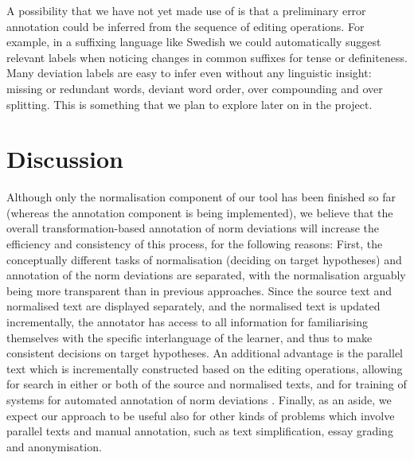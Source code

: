 \documentclass[10pt, a4paper]{article}
\newcommand{\dan}[1]{{\color{Fuchsia}{Dan: #1}}}
\newcommand{\elena}[1]{{\color{BrickRed}{Elena: #1}}}
\newcommand{\normAnn}[0]{our tool }
\begin{document}
A possibility that we have not yet made use of is that a preliminary error annotation could be inferred from the sequence of editing operations. For example, in a suffixing language like Swedish we could automatically
suggest relevant labels when noticing changes in common suffixes for tense
or definiteness.
Many deviation labels are easy to infer even without any linguistic
insight: missing or redundant words, deviant word order, over compounding
and over splitting.
This is something that we plan to explore later on in the project.


\section{Discussion}
\label{sec:discussion}


Although only the normalisation component of \normAnn has been finished so far (whereas the annotation component is being implemented), we believe that the overall transformation-based annotation of norm deviations
will increase the efficiency and consistency of this process, for the following reasons: %
First, the conceptually different tasks of normalisation (deciding on target hypotheses) and annotation of the norm deviations are separated, with the normalisation arguably being more transparent than in previous approaches. Since the source text and normalised text are displayed separately, and the normalised text is updated incrementally, the annotator has access to all information for familiarising themselves with the specific interlanguage of the learner, and thus to make consistent decisions on target hypotheses.
An additional advantage is the parallel text which is incrementally constructed based on the editing operations, allowing for search in either or both of the source and normalised texts, and for training of systems for automated annotation of norm deviations \cite{sproat2016rnn}.
Finally, as an aside, we expect our approach to be useful also for other kinds of problems which involve parallel texts and manual annotation, such as text simplification, %
 essay grading and anonymisation. %
\end{document}
